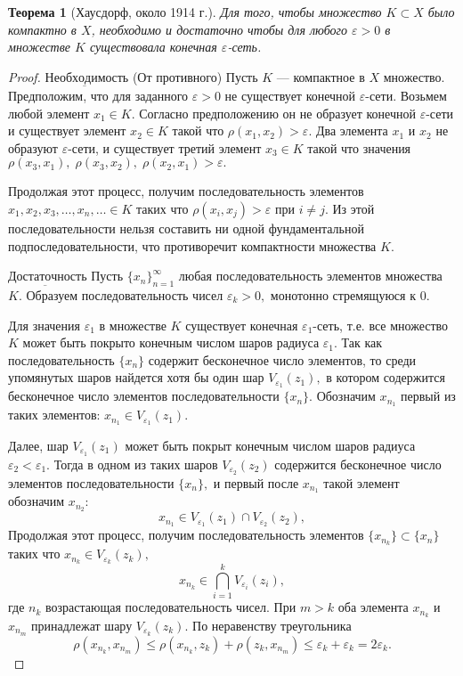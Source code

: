 \documentclass[12pt,a4paper,titlepage,oneside]{book}
\theoremstyle{definition}
\theoremstyle{plain}
\newtheorem*{theorem}{Теорема}
\theoremstyle{remark}
\theoremstyle{remark}
\theoremstyle{remark}
\theoremstyle{remark}
\theoremstyle{plain}
\theoremstyle{plain}
\begin{document}
\begin{theorem}[Хаусдорф, около 1914 г.]
Для того, чтобы множество $K \subset X$ было компактно в $X$, необходимо и достаточно чтобы для любого $\varepsilon > 0$ в множестве $K$ существовала конечная $\varepsilon$-сеть. 
\end{theorem}
\begin{proof}

$\underbar{Необходимость}$ (От противного) Пусть $K$  --- компактное в $X$ множество. Предположим, что для заданного $\varepsilon >0 $ не существует конечной $\varepsilon$-сети. Возьмем любой элемент $x_1 \in K.$ Согласно предположению он не образует конечной $\varepsilon$-сети и существует элемент $x_2 \in K$ такой что $\rho(x_1, x_2) > \varepsilon.$ Два элемента $x_1$ и $x_2$ не образуют $\varepsilon$-сети, и существует третий элемент $x_3 \in K$ такой что значения $\rho(x_3, x_1), \; \rho(x_3, x_2), \; \rho(x_2, x_1) > \varepsilon.$

Продолжая этот процесс, получим последовательность элементов $x_1,x_2,x_3, \ldots, x_n, \ldots \in K$ таких что $\rho(x_i, x_j) > \varepsilon$ при   $i \neq j.$ Из этой последовательности нельзя составить ни одной фундаментальной подпоследовательности, что противоречит компактности множества $K.$

$\underbar{Достаточность}$ Пусть $\{x_n\}_{n=1}^{\infty}$ любая последовательность элементов множества $K.$ Образуем последовательность чисел $\varepsilon _k > 0,$ монотонно стремящуюся к $0.$

Для значения $\varepsilon _1$  в множестве $K$ существует конечная $\varepsilon _1$-сеть, т.е. все множество $K$ может быть покрыто конечным числом шаров радиуса $\varepsilon _1 .$ Так как последовательность $\{ x_n \}$ содержит бесконечное число элементов, то среди упомянутых шаров найдется хотя бы один шар $V_{\varepsilon _1} (z_1),$ в котором содержится бесконечное число элементов последовательности $\{x_n\}.$ Обозначим $x_{n_1}$ первый из таких элементов: $x_{n_1} \in V_{\varepsilon _1} (z_1).$

Далее, шар $ V_{\varepsilon _1} (z_1) $ может быть покрыт конечным числом шаров радиуса $\varepsilon _2 < \varepsilon _1.$ Тогда в одном из таких шаров $V_{\varepsilon _2} (z_2)$ содержится бесконечное число элементов последовательности $\{x_n\},$ и первый после $x_{n_1}$ такой элемент обозначим $x_{n_2}:$
\begin{equation*}
x_{n_1} \in V_{\varepsilon _1} (z_1) \cap V_{\varepsilon _2} (z_2),
\end{equation*}
Продолжая этот процесс, получим последовательность элементов $\{x_{n_k}\} \subset \{x_n\}$ таких что $x_{n_k} \in V_{\varepsilon _k} (z_k),$
\begin{equation*}
x_{n_k} \in \bigcap\limits_{i=1}^{k} V_{\varepsilon _i} (z_i),
\end{equation*}
где $n_k$  возрастающая последовательность чисел. При $m > k$ оба элемента $x_{n_k}$ и $x_{n_m}$ принадлежат шару $V_{\varepsilon _k} (z_k).$ По неравенству треугольника 
\begin{equation*}
\rho(x_{n_k}, x_{n_m}) \leqslant \rho(x_{n_k}, z_k) + \rho(z_k, x_{n_m}) \leqslant \varepsilon_k + \varepsilon_k = 2 \varepsilon _k.
\end{equation*}
 

\end{proof}
\end{document}
